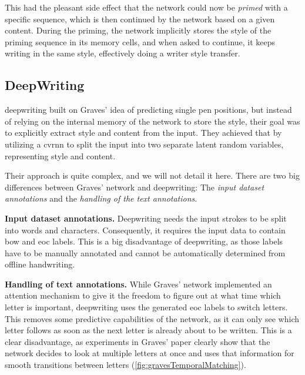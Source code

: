 This had the pleasant side effect that the network could now be \emph{primed} with a specific sequence, which is then continued by the network based on a given content. During the priming, the network implicitly stores the style of the priming sequence in its memory cells, and when asked to continue, it keeps writing in the same style, effectively doing a writer style transfer.

\subsection{DeepWriting}
\gls{deepwriting} built on Graves' idea of predicting single pen positions, but instead of relying on the internal memory of the network to store the style, their goal was to explicitly extract style and content from the input. They achieved that by utilizing a \gls{cvrnn} to split the input into two separate latent random variables, representing style and content.

Their approach is quite complex, and we will not detail it here. There are two big differences between Graves' network and \gls{deepwriting}: The \emph{input dataset annotations} and the \emph{handling of the text annotations}.

\textbf{Input dataset annotations.} Deepwriting needs the input strokes to be split into words and characters. Consequently, it requires the input data to contain \gls{bow} and \gls{eoc} labels. This is a big disadvantage of \gls{deepwriting}, as those labels have to be manually annotated and cannot be automatically determined from offline handwriting.

\textbf{Handling of text annotations.} While Graves' network implemented an attention mechanism to give it the freedom to figure out at what time which letter is important, \gls{deepwriting} uses the generated \gls{eoc} labels to switch letters. This removes some predictive capabilities of the network, as it can only see which letter follows as soon as the next letter is already about to be written. This is a clear disadvantage, as experiments in Graves' paper clearly show that the network decides to look at multiple letters at once and uses that information for smooth transitions between letters (\cref{fig:gravesTemporalMatching}).

